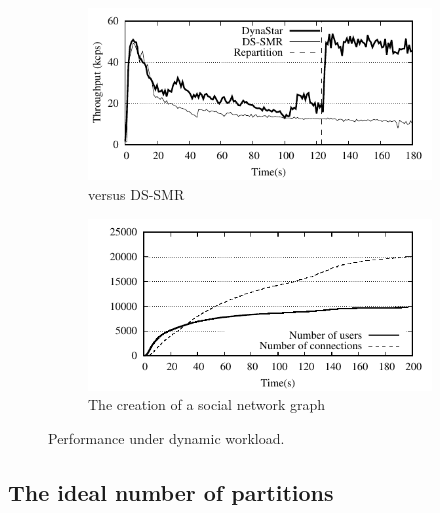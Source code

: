 \begin{figure}[h!]
  \centering
  \begin{subfigure}[b]{0.45\textwidth}
    \centering
    \includegraphics[width=0.95\columnwidth]{figures/socc/socc-dynamicload-tp}
    \caption{\dynastar versus DS-SMR}
  \end{subfigure}
  \begin{subfigure}[b]{0.45\textwidth}
    \centering
    \includegraphics[width=0.95\columnwidth]{figures/socc/socc-dynamicload-graph}
    \caption{The creation of a social network graph}
  \end{subfigure}
    \caption{Performance under dynamic workload.}
	\label{fig:dynamic_load_tput}
\end{figure}



\subsection{The ideal number of partitions}
\label{sec:evaluation:results}

